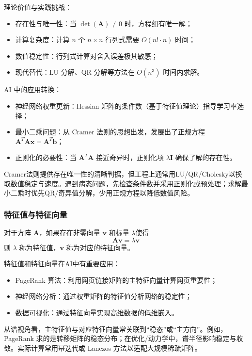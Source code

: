 \begin{itemize}
理论价值与实践挑战：
\begin{itemize}
  \item 存在性与唯一性：当 $\det(\mathbf{A}) \neq 0$ 时，方程组有唯一解；
  \item 计算复杂度：计算 $n$ 个 $n \times n$ 行列式需要 $O(n! \cdot n)$ 时间；
  \item 数值稳定性：行列式计算对舍入误差极其敏感；
  \item 现代替代：LU 分解、QR 分解等方法在 $O(n^3)$ 时间内求解。
\end{itemize}

AI 中的应用转换：
\begin{itemize}
  \item 神经网络权重更新：Hessian 矩阵的条件数（基于特征值理论）指导学习率选择；
  \item 最小二乘问题：从 Cramer 法则的思想出发，发展出了正规方程 $\mathbf{A}^T\mathbf{A}\mathbf{x} = \mathbf{A}^T\mathbf{b}$；
  \item 正则化的必要性：当 $\mathbf{A}^T\mathbf{A}$ 接近奇异时，正则化项 $\lambda\mathbf{I}$ 确保了解的存在性。
\end{itemize}

Cramer法则提供存在唯一性的清晰判据，但工程上通常用LU/QR/Cholesky以换取数值稳定与速度。遇到病态问题，先检查条件数并采用正则化或预处理；求解最小二乘时优先QR/奇异值分解，少用正规方程以降低数值风险。

\subsubsection{特征值与特征向量}
对于方阵 $\mathbf{A}$，如果存在非零向量 $\mathbf{v}$ 和标量 $\lambda$使得
$$
\mathbf{A}\mathbf{v} = \lambda\mathbf{v}
$$
则 $\lambda$ 称为特征值，$\mathbf{v}$ 称为对应的特征向量。

特征值和特征向量在AI中有重要应用：
\begin{itemize}
  \item PageRank 算法：利用网页链接矩阵的主特征向量计算网页重要性；
  \item 神经网络分析：通过权重矩阵的特征值分析网络的稳定性；
  \item 数据可视化：通过特征向量实现高维数据的低维嵌入。
\end{itemize}
 
从谱视角看，主特征值与对应特征向量常关联到“稳态”或“主方向”。例如，PageRank 求的是转移矩阵的稳态分布；在优化/动力学中，谱半径影响稳定与收敛。实际计算常用幂迭代或 Lanczos 方法以适配大规模稀疏矩阵。



\end{itemize}
